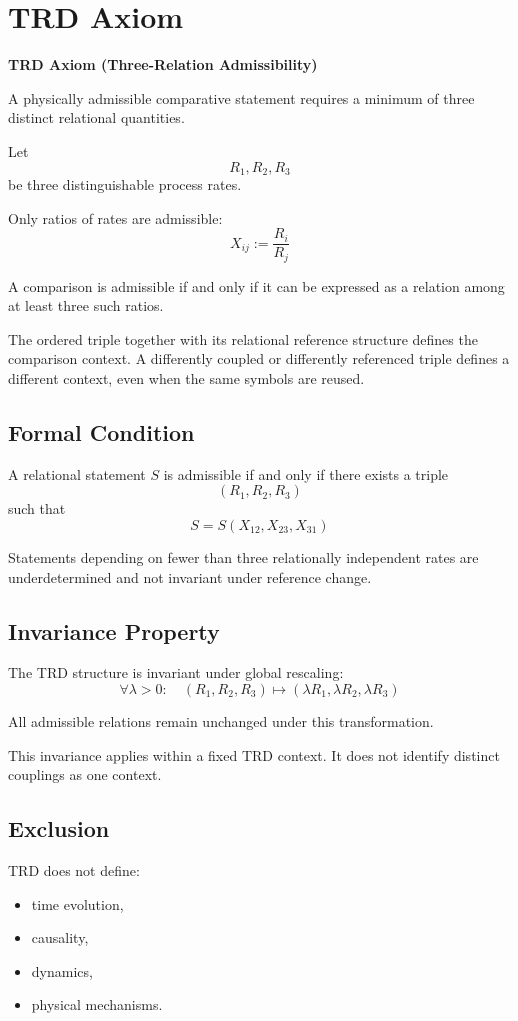 \section{TRD Axiom}

\textbf{TRD Axiom (Three-Relation Admissibility)}

A physically admissible comparative statement requires
a minimum of three distinct relational quantities.

Let
\[
R_1, R_2, R_3
\]
be three distinguishable process rates.

Only ratios of rates are admissible:
\[
X_{ij} := \frac{R_i}{R_j}
\]

A comparison is admissible if and only if
it can be expressed as a relation among at least three such ratios.

The ordered triple together with its relational reference structure defines
the comparison context. A differently coupled or differently referenced triple
defines a different context, even when the same symbols are reused.

\subsection*{Formal Condition}

A relational statement $S$ is admissible if and only if
there exists a triple
\[
(R_1, R_2, R_3)
\]
such that
\[
S = S(X_{12}, X_{23}, X_{31})
\]

Statements depending on fewer than three relationally independent
rates are underdetermined and not invariant under reference change.

\subsection*{Invariance Property}

The TRD structure is invariant under global rescaling:
\[
\forall \lambda > 0:\quad
(R_1, R_2, R_3) \mapsto (\lambda R_1, \lambda R_2, \lambda R_3)
\]

All admissible relations remain unchanged under this transformation.

This invariance applies within a fixed TRD context. It does not identify
distinct couplings as one context.

\subsection*{Exclusion}

TRD does not define:
\begin{itemize}
    \item time evolution,
    \item causality,
    \item dynamics,
    \item physical mechanisms.
\end{itemize}

